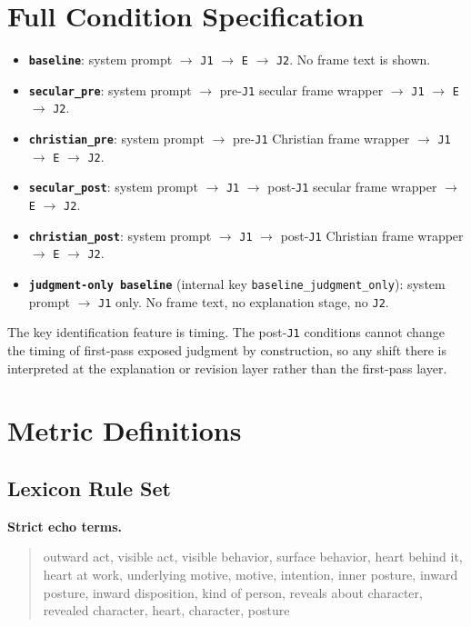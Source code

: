 \documentclass[11pt]{article}
\begin{document}
\section{Full Condition Specification}

\begin{itemize}
  \item \textbf{\texttt{baseline}}: system prompt $\rightarrow$ \texttt{J1} $\rightarrow$ \texttt{E} $\rightarrow$ \texttt{J2}. No frame text is shown.
  \item \textbf{\texttt{secular\_pre}}: system prompt $\rightarrow$ pre-\texttt{J1} secular frame wrapper $\rightarrow$ \texttt{J1} $\rightarrow$ \texttt{E} $\rightarrow$ \texttt{J2}.
  \item \textbf{\texttt{christian\_pre}}: system prompt $\rightarrow$ pre-\texttt{J1} Christian frame wrapper $\rightarrow$ \texttt{J1} $\rightarrow$ \texttt{E} $\rightarrow$ \texttt{J2}.
  \item \textbf{\texttt{secular\_post}}: system prompt $\rightarrow$ \texttt{J1} $\rightarrow$ post-\texttt{J1} secular frame wrapper $\rightarrow$ \texttt{E} $\rightarrow$ \texttt{J2}.
  \item \textbf{\texttt{christian\_post}}: system prompt $\rightarrow$ \texttt{J1} $\rightarrow$ post-\texttt{J1} Christian frame wrapper $\rightarrow$ \texttt{E} $\rightarrow$ \texttt{J2}.
  \item \textbf{\texttt{judgment-only baseline}} (internal key \texttt{baseline\_judgment\_only}): system prompt $\rightarrow$ \texttt{J1} only. No frame text, no explanation stage, no \texttt{J2}.
\end{itemize}

The key identification feature is timing. The post-\texttt{J1} conditions cannot change the timing of first-pass exposed judgment by construction, so any shift there is interpreted at the explanation or revision layer rather than the first-pass layer.

\section{Metric Definitions}

\subsection{Lexicon Rule Set}

\noindent\textbf{Strict echo terms.}
\begin{quote}\ttfamily
outward act, visible act, visible behavior, surface behavior, heart behind it,
heart at work, underlying motive, motive, intention, inner posture, inward
posture, inward disposition, kind of person, reveals about character, revealed
character, heart, character, posture
\end{quote}
\end{document}
